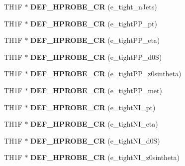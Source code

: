 \begin{DoxyCompactItemize}
\item 
\hypertarget{classHistos__Fake_ac89afd8e132606c89797633a8c72db7b}{
TH1F $\ast$ {\bfseries DEF\_\-HPROBE\_\-CR} (e\_\-tight\_\-nJets)}
\label{classHistos__Fake_ac89afd8e132606c89797633a8c72db7b}

\item 
\hypertarget{classHistos__Fake_a372b111b28ae6a6b2018c86765fa57c8}{
TH1F $\ast$ {\bfseries DEF\_\-HPROBE\_\-CR} (e\_\-tightPP\_\-pt)}
\label{classHistos__Fake_a372b111b28ae6a6b2018c86765fa57c8}

\item 
\hypertarget{classHistos__Fake_a073f6466017fbf9bb00a9c8209661ac8}{
TH1F $\ast$ {\bfseries DEF\_\-HPROBE\_\-CR} (e\_\-tightPP\_\-eta)}
\label{classHistos__Fake_a073f6466017fbf9bb00a9c8209661ac8}

\item 
\hypertarget{classHistos__Fake_a782eece4980ce4dfc5eecb851f0f9727}{
TH1F $\ast$ {\bfseries DEF\_\-HPROBE\_\-CR} (e\_\-tightPP\_\-d0S)}
\label{classHistos__Fake_a782eece4980ce4dfc5eecb851f0f9727}

\item 
\hypertarget{classHistos__Fake_aa40eaa77addc8c3d6dccb5740e6a51f9}{
TH1F $\ast$ {\bfseries DEF\_\-HPROBE\_\-CR} (e\_\-tightPP\_\-z0sintheta)}
\label{classHistos__Fake_aa40eaa77addc8c3d6dccb5740e6a51f9}

\item 
\hypertarget{classHistos__Fake_aa0972b4f80cd87cb4a0ec5035f81d374}{
TH1F $\ast$ {\bfseries DEF\_\-HPROBE\_\-CR} (e\_\-tightPP\_\-met)}
\label{classHistos__Fake_aa0972b4f80cd87cb4a0ec5035f81d374}

\item 
\hypertarget{classHistos__Fake_a58b3d7790f691abe2c739517676b6236}{
TH1F $\ast$ {\bfseries DEF\_\-HPROBE\_\-CR} (e\_\-tightNI\_\-pt)}
\label{classHistos__Fake_a58b3d7790f691abe2c739517676b6236}

\item 
\hypertarget{classHistos__Fake_a47e0fef2a80e39f29c1fdf6199c5ff42}{
TH1F $\ast$ {\bfseries DEF\_\-HPROBE\_\-CR} (e\_\-tightNI\_\-eta)}
\label{classHistos__Fake_a47e0fef2a80e39f29c1fdf6199c5ff42}

\item 
\hypertarget{classHistos__Fake_a55ed7cc5c0c312ecc23adf2ff2b7f73b}{
TH1F $\ast$ {\bfseries DEF\_\-HPROBE\_\-CR} (e\_\-tightNI\_\-d0S)}
\label{classHistos__Fake_a55ed7cc5c0c312ecc23adf2ff2b7f73b}

\item 
\hypertarget{classHistos__Fake_a1e207d9d662686e7d0b85f778b13b690}{
TH1F $\ast$ {\bfseries DEF\_\-HPROBE\_\-CR} (e\_\-tightNI\_\-z0sintheta)}
\label{classHistos__Fake_a1e207d9d662686e7d0b85f778b13b690}


\end{DoxyCompactItemize}
